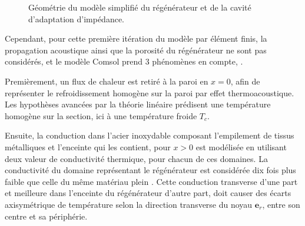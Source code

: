 \begin{figure}[!ht]
    \centering
    \caption{Géométrie du modèle simplifié du régénérateur et de la cavité d'adaptation d'impédance.}
    \label{fig:Comsol_ModeleSimplifie_Geometrie}
\end{figure}

Cependant, pour cette première itération du modèle par élément finis, la propagation acoustique ainsi que la porosité du régénérateur ne sont pas considérés, et le modèle Comsol prend 3 phénomènes en compte, .\medskip

Premièrement, un flux de chaleur est retiré à la paroi en $x=0$, afin de représenter le refroidissement homogène sur la paroi par effet thermoacoustique. Les hypothèses avancées par la théorie linéaire prédisent une température homogène sur la section, ici à une température froide $T_c$.\smallskip

Ensuite, la conduction dans l'acier inoxydable composant l'empilement de tissus métalliques et l'enceinte qui les contient, pour $x>0$ est modélisée en utilisant deux valeur de conductivité thermique, pour chacun de ces domaines. La conductivité du domaine représentant le régénérateur est considérée dix fois plus faible que celle du même matériau plein \cite{swift_thermoacoustics_2017} . Cette conduction transverse d'une part et meilleure dans l'enceinte du régénérateur d'autre part, doit causer des écarts axisymétrique de température selon la direction transverse du noyau $\mathbf e_r$, entre son centre et sa périphérie.\smallskip

